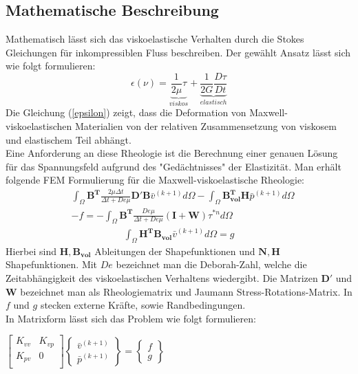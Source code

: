 \documentclass[12pt]{article}
\begin{document}
\subsection{Mathematische Beschreibung}
Mathematisch lässt sich das viskoelastische Verhalten durch die Stokes Gleichungen für inkompressiblen Fluss beschreiben. Der gewählt Ansatz lässt sich wie folgt formulieren:
\begin{equation}
	\epsilon (\nu) = \underbrace{\frac{1}{2\mu}\tau}_{viskos} + \underbrace{\frac{1}{2G}\frac{D\tau}{Dt}}_{elastisch}
	\label{epsilon}
\end{equation}
Die Gleichung (\ref{epsilon}) zeigt, dass die Deformation von Maxwell-viskoelastischen Materialien von der relativen Zusammensetzung von viskosem und elastischem Teil abhängt.
\\
Eine Anforderung an diese Rheologie ist die Berechnung einer genauen Lösung für das Spannungsfeld aufgrund des "Gedächtnisses" der Elastizität.
Man erhält folgende FEM Formulierung für die Maxwell-viskoelastische Rheologie:
		\begin{align*}
&\int_{\Omega} \boldsymbol{B^T} \frac{2\mu \Delta t}{\Delta t + De\mu} \boldsymbol{D'} \boldsymbol{B} \bar{v}^{(k+1)} d\Omega -  \int_{\Omega} \boldsymbol{B^T_{vol}} \boldsymbol{H} \bar{p}^{(k+1)} d\Omega \\ 
&-f  = -\int_{\Omega} \boldsymbol{B^T} \frac{De\mu}{\Delta t + De\mu}(\boldsymbol{I}+\boldsymbol{W})\tau^{*n} d\Omega
\end{align*}
\begin{align*}
\int_{\Omega} \boldsymbol{H^T} \boldsymbol{B_{vol}}  \bar{v}^{(k+1)} d\Omega = g
\end{align*}
Hierbei sind $\boldsymbol{H}, \boldsymbol{B_{vol}}$ Ableitungen der Shapefunktionen und $\boldsymbol{N}, \boldsymbol{H}$ Shapefunktionen. Mit $De$ bezeichnet man die Deborah-Zahl, welche die Zeitabhängigkeit des viskoelastischen Verhaltens wiedergibt. Die Matrizen $\boldsymbol{D'}$ und $\boldsymbol{W}$ bezeichnet man als Rheologiematrix und Jaumann Stress-Rotations-Matrix. In $f$ und $g$ stecken externe Kräfte, sowie Randbedingungen.
\\
In Matrixform lässt sich das Problem wie folgt formulieren: \\
\newline
\begin{center}
	$\begin{bmatrix}
	K_{vv} & K_{vp} \\
	K_{pv} & 0 \\
	\end{bmatrix}
	\begin{Bmatrix}
	\bar{v}^{(k+1)} \\
	\bar{p}^{(k+1)}
	\end{Bmatrix}
	= \begin{Bmatrix}
	f \\
	g
	\end{Bmatrix}$
\end{center}
\end{document}
